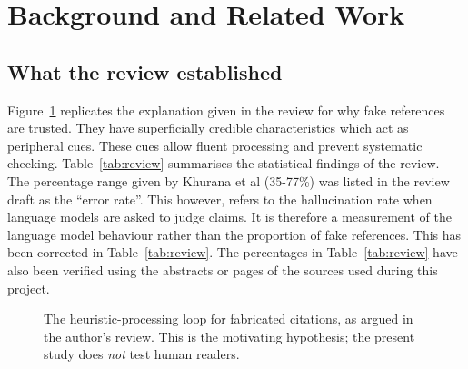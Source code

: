 \section{Background and Related Work}
\subsection{What the review established}
Figure~\ref{fig:loop} replicates the explanation given in the review for why fake references are trusted. They have superficially
credible characteristics which act as peripheral cues. These cues allow fluent processing and prevent systematic checking.
Table~\ref{tab:review} summarises the statistical findings of the review. The percentage range given by Khurana et al (35-77\%) was
listed in the review draft as the ``error rate''. This however, refers to the hallucination rate when language models are asked
to judge claims. It is therefore a measurement of the language model behaviour rather than the proportion of fake references. This has been corrected in Table~\ref{tab:review}. The percentages in Table~\ref{tab:review} have also been verified using the abstracts or pages of the sources used during this project.

\begin{figure}[t]
\centering
{}
\caption{The heuristic-processing loop for fabricated citations, as argued in the author's review.
This is the motivating hypothesis; the present study does \emph{not} test human readers.}
\label{fig:loop}
\end{figure}

